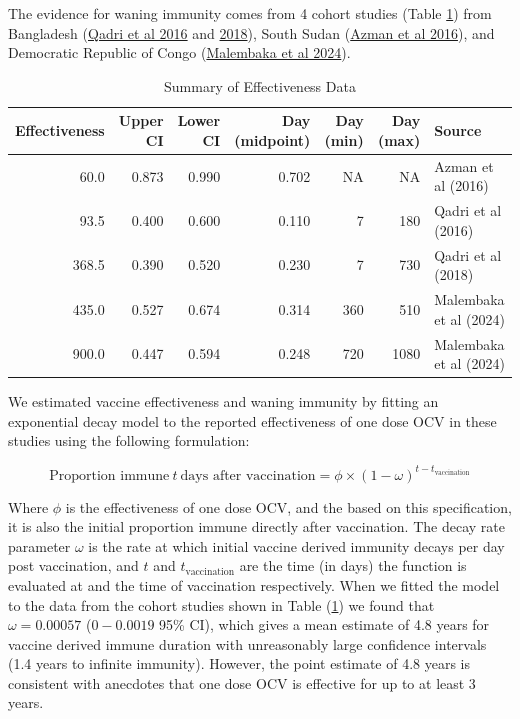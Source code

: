 \documentclass[
]{book}
\begin{document}
The evidence for waning immunity comes from 4 cohort studies (Table \ref{tab:effectiveness-papers}) from Bangladesh (\href{https://www.nejm.org/doi/full/10.1056/NEJMoa1510330}{Qadri et al 2016} and \href{https://www.thelancet.com/journals/laninf/article/PIIS1473-3099(18)30108-7/fulltext}{2018}), South Sudan (\href{https://www.thelancet.com/journals/langlo/article/PIIS2214-109X(16)30211-X/fulltext}{Azman et al 2016}), and Democratic Republic of Congo (\href{https://www.thelancet.com/journals/laninf/article/PIIS1473-3099(23)00742-9/fulltext}{Malembaka et al 2024}).

\begin{table}

\caption{\label{tab:effectiveness-papers}Summary of Effectiveness Data}
\centering
\begin{tabular}[t]{r|r|r|r|r|r|l}
\hline
Effectiveness & Upper CI & Lower CI & Day (midpoint) & Day (min) & Day (max) & Source\\
\hline
60.0 & 0.873 & 0.990 & 0.702 & NA & NA & Azman et al (2016)\\
\hline
93.5 & 0.400 & 0.600 & 0.110 & 7 & 180 & Qadri et al (2016)\\
\hline
368.5 & 0.390 & 0.520 & 0.230 & 7 & 730 & Qadri et al (2018)\\
\hline
435.0 & 0.527 & 0.674 & 0.314 & 360 & 510 & Malembaka et al (2024)\\
\hline
900.0 & 0.447 & 0.594 & 0.248 & 720 & 1080 & Malembaka et al (2024)\\
\hline
\end{tabular}
\end{table}

We estimated vaccine effectiveness and waning immunity by fitting an exponential decay model to the reported effectiveness of one dose OCV in these studies using the following formulation:

\begin{equation} 
\text{Proportion immune}\ t \ \text{days after vaccination} = \phi \times (1 - \omega) ^ {t-t_{\text{vaccination}}}
\label{eq:omega}
\end{equation}

Where \(\phi\) is the effectiveness of one dose OCV, and the based on this specification, it is also the initial proportion immune directly after vaccination. The decay rate parameter \(\omega\) is the rate at which initial vaccine derived immunity decays per day post vaccination, and \(t\) and \(t_{\text{vaccination}}\) are the time (in days) the function is evaluated at and the time of vaccination respectively. When we fitted the model to the data from the cohort studies shown in Table (\ref{tab:effectiveness-papers}) we found that \(\omega = 0.00057\) (\(0-0.0019\) 95\% CI), which gives a mean estimate of 4.8 years for vaccine derived immune duration with unreasonably large confidence intervals (1.4 years to infinite immunity). However, the point estimate of 4.8 years is consistent with anecdotes that one dose OCV is effective for up to at least 3 years.
\end{document}
